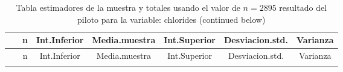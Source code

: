\documentclass[
]{article}
\begin{document}
\begin{longtable}[]{@{}ccccccc@{}}
\caption{Tabla estimadores de la muestra y totales usando el valor de
\(n = 2895\) resultado del piloto para la variable: chlorides (continued
below)}\tabularnewline
\toprule
\begin{minipage}[b]{0.20\columnwidth}\centering
~\strut
\end{minipage} & \begin{minipage}[b]{0.05\columnwidth}\centering
n\strut
\end{minipage} & \begin{minipage}[b]{0.11\columnwidth}\centering
Int.Inferior\strut
\end{minipage} & \begin{minipage}[b]{0.12\columnwidth}\centering
Media.muestra\strut
\end{minipage} & \begin{minipage}[b]{0.11\columnwidth}\centering
Int.Superior\strut
\end{minipage} & \begin{minipage}[b]{0.13\columnwidth}\centering
Desviacion.std.\strut
\end{minipage} & \begin{minipage}[b]{0.09\columnwidth}\centering
Varianza\strut
\end{minipage}\tabularnewline
\midrule
\endfirsthead
\toprule
\begin{minipage}[b]{0.20\columnwidth}\centering
~\strut
\end{minipage} & \begin{minipage}[b]{0.05\columnwidth}\centering
n\strut
\end{minipage} & \begin{minipage}[b]{0.11\columnwidth}\centering
Int.Inferior\strut
\end{minipage} & \begin{minipage}[b]{0.12\columnwidth}\centering
Media.muestra\strut
\end{minipage} & \begin{minipage}[b]{0.11\columnwidth}\centering
Int.Superior\strut
\end{minipage} & \begin{minipage}[b]{0.13\columnwidth}\centering
Desviacion.std.\strut
\end{minipage} & \begin{minipage}[b]{0.09\columnwidth}\centering
Varianza\strut
\end{minipage}\tabularnewline
\midrule
\endhead
\begin{minipage}[t]{0.20\columnwidth}\centering

\end{minipage}
\end{longtable}
\end{document}
